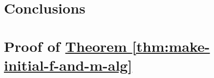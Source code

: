 \documentclass{jfp1}
\newcommand{\thmref}[1]{\hyperref[#1]{Theorem \ref*{#1}}}
\begin{document}
\section{Conclusions}
\label{sec:conclusions}





\appendix

\section{Proof of \thmref{thm:make-initial-f-and-m-alg}}
\label{sec:make-initial-fm-proof}
\end{document}
